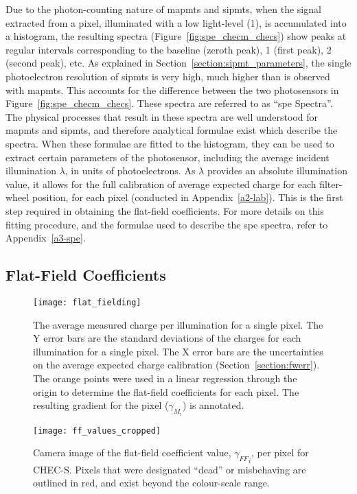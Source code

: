 Due to the photon-counting nature of \glspl{mapmt} and \glspl{sipmt}, when the signal extracted from a pixel, illuminated with a low light-level (\utilde\SI{1}{\pe}), is accumulated into a histogram, the resulting spectra (Figure~\ref{fig:spe_checm_checs}) show peaks at regular intervals corresponding to the baseline (zeroth peak), \SI{1}{\pe} (first peak), \SI{2}{\pe} (second peak), etc. As explained in Section~\ref{section:sipmt_parameters}, the single photoelectron resolution of \glspl{sipmt} is very high, much higher than is observed with \glspl{mapmt}. This accounts for the difference between the two photosensors in Figure~\ref{fig:spe_checm_checs}. These spectra are referred to as ``\gls{spe} Spectra''. The physical processes that result in these spectra are well understood for \glspl{mapmt} and \glspl{sipmt}, and therefore analytical formulae exist which describe the spectra. When these formulae are fitted to the histogram, they can be used to extract certain parameters of the photosensor, including the average incident illumination $\lambda$, in units of photoelectrons. As $\lambda$ provides an absolute illumination value, it allows for the full calibration of average expected charge for each filter-wheel position, for each pixel (conducted in Appendix~\ref{a2-lab}). This is the first step required in obtaining the flat-field coefficients. For more details on this fitting procedure, and the formulae used to describe the \gls{spe} spectra, refer to Appendix~\ref{a3-spe}.

\subsection{Flat-Field Coefficients}

\begin{figure}
	\centering
    \texttt{[image: flat\_fielding]} 
	\caption[Flat-field calibration]{The average measured charge per illumination for a single pixel. The Y error bars are the standard deviations of the charges for each illumination for a single pixel. The X error bars are the uncertainties on the average expected charge calibration (Section~\ref{section:fwerr}). The orange points were used in a linear regression through the origin to determine the flat-field coefficients for each pixel. The resulting gradient for the pixel ($\gamma_{M_i}$) is annotated.} 
	\label{fig:flat_fielding}
\end{figure}

\begin{figure}
	\centering
    \texttt{[image: ff\_values\_cropped]} 
	\caption[Flat-field Coefficients]{Camera image of the flat-field coefficient value, ${\gamma_{FF}}_i$, per pixel for CHEC-S. Pixels that were designated ``dead'' or misbehaving are outlined in red, and exist beyond the colour-scale range.}
	\label{fig:ff_values}
\end{figure}


